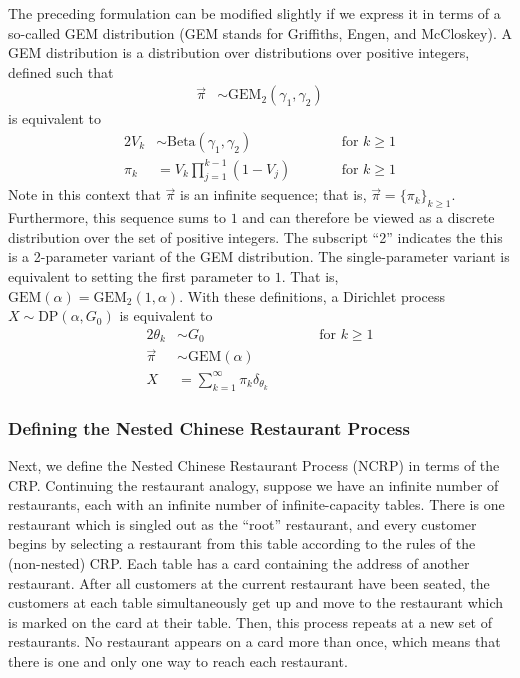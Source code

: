 \documentclass{article}
\begin{document}
The preceding formulation can be modified slightly if we express it in terms of a so-called GEM distribution (GEM stands for Griffiths, Engen, and McCloskey).
A GEM distribution is a distribution over distributions over positive integers, defined such that
\begin{align}
\vec \pi &\sim \text{GEM}_2(\gamma_1, \gamma_2)
\end{align}
is equivalent to
\begin{alignat}{2}
V_k &\sim \text{Beta}(\gamma_1, \gamma_2) &\qquad& \text{for $k \geq 1$} \\
\pi_k &= V_k \prod_{j=1}^{k-1} (1 - V_j) &\qquad& \text{for $k \geq 1$}
\end{alignat}
Note in this context that $\vec \pi$ is an infinite sequence; that is, $\vec \pi = \{ \pi_k \}_{k \geq 1}$.
Furthermore, this sequence sums to $1$ and can therefore be viewed as a discrete distribution over the set of positive integers.
The subscript ``2'' indicates the this is a 2-parameter variant of the GEM distribution.
The single-parameter variant is equivalent to setting the first parameter to $1$.
That is, $\text{GEM}(\alpha) = \text{GEM}_2(1, \alpha)$.
With these definitions, a Dirichlet process $X \sim \text{DP}(\alpha, G_0)$ is equivalent to
\begin{alignat}{2}
\theta_k &\sim G_0 &\qquad& \text{for $k \geq 1$} \\
\vec \pi &\sim \text{GEM}(\alpha) && \\
X &= \sum_{k=1}^\infty \pi_k \delta_{\theta_k} &&
\end{alignat}

\subsubsection{Defining the Nested Chinese Restaurant Process}

Next, we define the Nested Chinese Restaurant Process (NCRP) in terms of the CRP.
Continuing the restaurant analogy, suppose we have an infinite number of restaurants, each with an infinite number of infinite-capacity tables.
There is one restaurant which is singled out as the ``root'' restaurant, and every customer begins by selecting a restaurant from this table according to the rules of the (non-nested) CRP.
Each table has a card containing the address of another restaurant.
After all customers at the current restaurant have been seated, the customers at each table simultaneously get up and move to the restaurant which is marked on the card at their table.
Then, this process repeats at a new set of restaurants.
No restaurant appears on a card more than once, which means that there is one and only one way to reach each restaurant.
\end{document}
